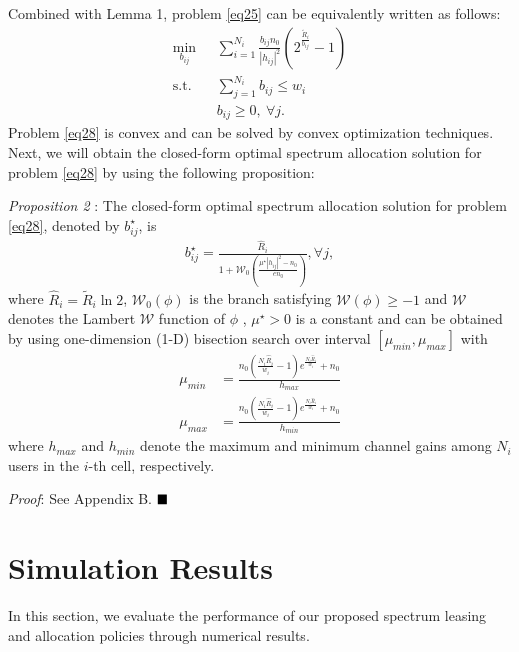 \documentclass[journal]{IEEEtran}
\begin{document}
Combined with Lemma 1, problem \eqref{eq25} can be equivalently written as follows:
\begin{subequations}\label{eq28}
	\begin{align}
	\min_{b_{ij}}\ & \sum\limits_{i = 1}^{N_i} \frac{b_{ij}n_0}{\left|h_{ij}\right|^2}\left(2^{\frac{\tilde{R}_i}{b_{ij}}} - 1\right) \label{q28a} \\ \mbox{s.t.} \quad &  \sum\limits_{j = 1}^{N_i} b_{ij} \leq w_i \label{q28b} \\
	& b_{ij} \geq 0, \ \forall j. \label{q14c}
	\end{align}
\end{subequations}
Problem \eqref{eq28} is convex and can be solved by convex optimization techniques. Next, we will obtain the closed-form optimal spectrum allocation solution for problem \eqref{eq28} by using the following proposition:

\textit{Proposition 2} : The closed-form optimal spectrum allocation solution for problem \eqref{eq28}, denoted by $b_{ij}^\star$, is
\begin{align}
b_{ij}^\star = \frac{\hat{R}_i}{1 + \mathcal{W}_0\left(\frac{\mu^{\star}\left|h_{ij}\right|^2 - n_0}{en_0}\right)}, \forall j,
\end{align}
where $\hat{R}_i = \tilde{R}_i\ln2$, $\mathcal{W}_0\left(\phi\right)$ is the branch satisfying $\mathcal{W}\left(\phi\right) \geq -1$ and $\mathcal{W}$ denotes the Lambert $\mathcal{W}$ function of $\phi$ \cite{RMCorless}, $\mu^{\star} > 0$ is a constant and can be obtained by using one-dimension (1-D) bisection search over interval $\left[\mu_{min}, \mu_{max}\right]$ with
\begin{align}
\mu_{min} &= \frac{n_0\left(\frac{N_i\hat{R}_i}{w_i} - 1\right)e^{\frac{N_i\hat{R}_i}{w_i}} + n_0}{h_{max}}  \\
\mu_{max} & = \frac{n_0\left(\frac{N_i\hat{R}_i}{w_i} - 1\right)e^{\frac{N_i\hat{R}_i}{w_i}} + n_0}{h_{min}}
\end{align}
where $h_{max}$ and $h_{min}$ denote the maximum and minimum channel gains among $N_i$ users in the $i$-th cell, respectively.

\textit{Proof}: See Appendix B.  $\hfill\blacksquare$
\section{Simulation Results}
In this section, we evaluate the performance of our proposed spectrum leasing and allocation policies through numerical results. 
\end{document}
